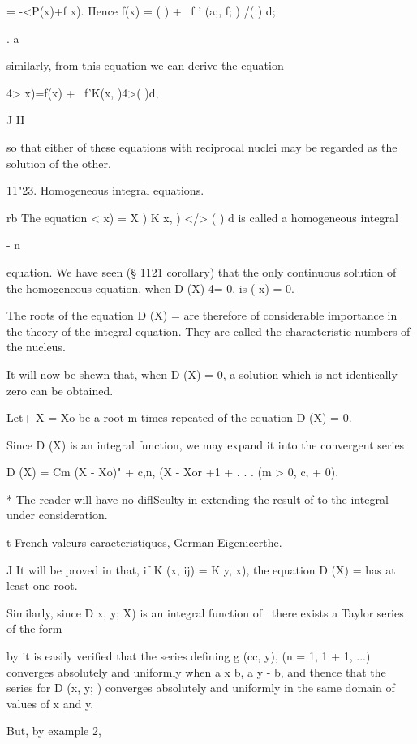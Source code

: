 = -<P(x)+f x). Hence f(x) = ( ) + \ f ' (a;, f; ) /( ) d;

. a

similarly, from this equation we can derive the equation

4> x)=f(x) + \ f'K(x, )4>( )d,

J II

so that either of these equations with reciprocal nuclei may be
regarded as the solution of the other.

11"23. Homogeneous integral equations.

rb The equation < x) = X ) K x, ) </> ( ) d is called a homogeneous
integral

- n

equation. We have seen (§ 1121 corollary) that the only continuous
solution of the homogeneous equation, when D (X) 4= 0, is ( x) = 0.

The roots of the equation D (X) = are therefore of considerable
importance in the theory of the integral equation. They are called the
characteristic numbers of the nucleus.

It will now be shewn that, when D (X) = 0, a solution which is not
identically zero can be obtained.

Let+ X = Xo be a root m times repeated of the equation D (X) = 0.

Since D (X) is an integral function, we may expand it into the
convergent series

D (X) = Cm (X - Xo)" + c,n, (X - Xor +1 + . . . (m > 0, c, + 0).

* The reader will have no diflSculty in extending the result of
to the integral under consideration.

t French valeurs caracteristiques, German Eigenicerthe.

J It will be proved in that, if K (x, ij) = K y, x), the
equation D (X) = has at least one root.

%
%

Similarly, since D x, y; X) is an integral function of \, there
exists a Taylor series of the form

by it is easily verified that the series defining g (cc, y), (n
= 1, 1 + 1, ...) converges absolutely and uniformly when a x b, a y -
b, and thence that the series for D (x, y; ) converges absolutely and
uniformly in the same domain of values of x and y.

But, by example 2,

